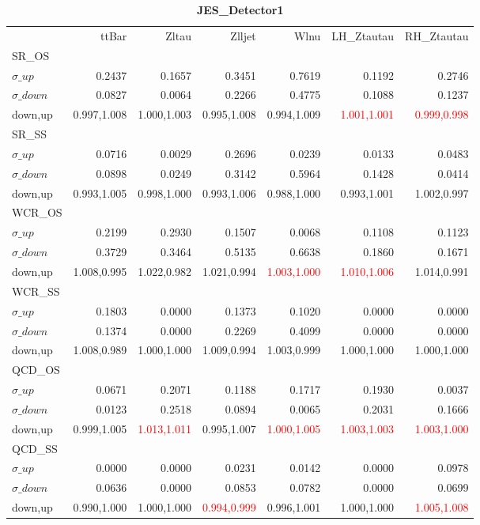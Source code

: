 \documentclass[11pt,oneside,a4paper]{article}
\begin{document}
\begin{table}
\centering
\caption{\bf{JES\_Detector1}}
\begin{tabular}{lrrrrrr}
 & ttBar & Zltau & Zlljet & Wlnu & LH\_Ztautau & RH\_Ztautau \\
SR\_OS &  &  &  &  &  &  \\
$\sigma\_up$ & 0.2437 & 0.1657 & 0.3451 & 0.7619 & 0.1192 & 0.2746 \\
$\sigma\_down$ & 0.0827 & 0.0064 & 0.2266 & 0.4775 & 0.1088 & 0.1237 \\
down,up & 0.997,1.008 & 1.000,1.003 & 0.995,1.008 & 0.994,1.009 & \textcolor{red}{1.001,1.001} & \textcolor{red}{0.999,0.998} \\

\hline
SR\_SS &  &  &  &  &  &  \\
$\sigma\_up$ & 0.0716 & 0.0029 & 0.2696 & 0.0239 & 0.0133 & 0.0483 \\
$\sigma\_down$ & 0.0898 & 0.0249 & 0.3142 & 0.5964 & 0.1428 & 0.0414 \\
down,up & 0.993,1.005 & 0.998,1.000 & 0.993,1.006 & 0.988,1.000 & 0.993,1.001 & 1.002,0.997 \\

\hline
WCR\_OS &  &  &  &  &  &  \\
$\sigma\_up$ & 0.2199 & 0.2930 & 0.1507 & 0.0068 & 0.1108 & 0.1123 \\
$\sigma\_down$ & 0.3729 & 0.3464 & 0.5135 & 0.6638 & 0.1860 & 0.1671 \\
down,up & 1.008,0.995 & 1.022,0.982 & 1.021,0.994 & \textcolor{red}{1.003,1.000} & \textcolor{red}{1.010,1.006} & 1.014,0.991 \\

\hline
WCR\_SS &  &  &  &  &  &  \\
$\sigma\_up$ & 0.1803 & 0.0000 & 0.1373 & 0.1020 & 0.0000 & 0.0000 \\
$\sigma\_down$ & 0.1374 & 0.0000 & 0.2269 & 0.4099 & 0.0000 & 0.0000 \\
down,up & 1.008,0.989 & 1.000,1.000 & 1.009,0.994 & 1.003,0.999 & 1.000,1.000 & 1.000,1.000 \\

\hline
QCD\_OS &  &  &  &  &  &  \\
$\sigma\_up$ & 0.0671 & 0.2071 & 0.1188 & 0.1717 & 0.1930 & 0.0037 \\
$\sigma\_down$ & 0.0123 & 0.2518 & 0.0894 & 0.0065 & 0.2031 & 0.1666 \\
down,up & 0.999,1.005 & \textcolor{red}{1.013,1.011} & 0.995,1.007 & \textcolor{red}{1.000,1.005} & \textcolor{red}{1.003,1.003} & \textcolor{red}{1.003,1.000} \\

\hline
QCD\_SS &  &  &  &  &  &  \\
$\sigma\_up$ & 0.0000 & 0.0000 & 0.0231 & 0.0142 & 0.0000 & 0.0978 \\
$\sigma\_down$ & 0.0636 & 0.0000 & 0.0853 & 0.0782 & 0.0000 & 0.0699 \\
down,up & 0.990,1.000 & 1.000,1.000 & \textcolor{red}{0.994,0.999} & 0.996,1.001 & 1.000,1.000 & \textcolor{red}{1.005,1.008} \\

\hline
\end{tabular}
\end{table}
\end{document}
